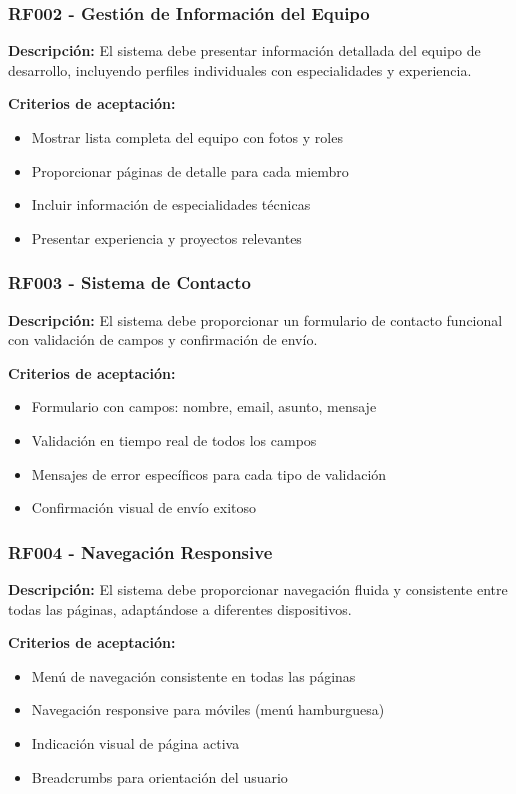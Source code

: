 \subsubsection{RF002 - Gestión de Información del Equipo}
\textbf{Descripción:} El sistema debe presentar información detallada del equipo de desarrollo, incluyendo perfiles individuales con especialidades y experiencia.

\textbf{Criterios de aceptación:}
\begin{itemize}
    \item Mostrar lista completa del equipo con fotos y roles
    \item Proporcionar páginas de detalle para cada miembro
    \item Incluir información de especialidades técnicas
    \item Presentar experiencia y proyectos relevantes
\end{itemize}

\subsubsection{RF003 - Sistema de Contacto}
\textbf{Descripción:} El sistema debe proporcionar un formulario de contacto funcional con validación de campos y confirmación de envío.

\textbf{Criterios de aceptación:}
\begin{itemize}
    \item Formulario con campos: nombre, email, asunto, mensaje
    \item Validación en tiempo real de todos los campos
    \item Mensajes de error específicos para cada tipo de validación
    \item Confirmación visual de envío exitoso
\end{itemize}

\subsubsection{RF004 - Navegación Responsive}
\textbf{Descripción:} El sistema debe proporcionar navegación fluida y consistente entre todas las páginas, adaptándose a diferentes dispositivos.

\textbf{Criterios de aceptación:}
\begin{itemize}
    \item Menú de navegación consistente en todas las páginas
    \item Navegación responsive para móviles (menú hamburguesa)
    \item Indicación visual de página activa
    \item Breadcrumbs para orientación del usuario
\end{itemize}

